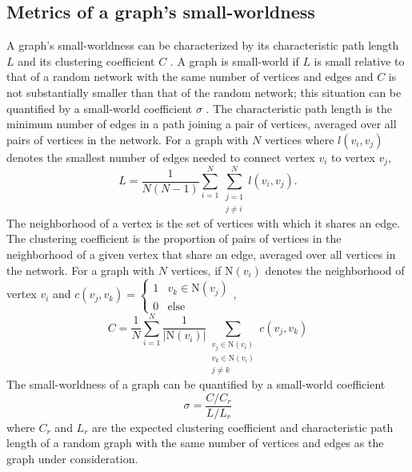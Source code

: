 \documentclass[format=sigconf]{acmart}
\begin{document}
\begin{appendices}


\section{Metrics of a graph's small-worldness}
\label{app:sw_metrics}

A graph's small-worldness can be characterized by its characteristic path length $L$ and its clustering coefficient $C$ \cite{watts98}. A graph is small-world if $L$ is small relative to that of a random network with the same number of vertices and edges and $C$ is not substantially smaller than that of the random network; this situation can be quantified by a small-world coefficient $\sigma$ \cite{humphries2008}. The characteristic path length is the minimum number of edges in a path joining a pair of vertices, averaged over all pairs of vertices in the network. For a graph with $N$ vertices where $l(v_i,v_j)$ denotes the smallest number of edges needed to connect vertex $v_i$ to vertex $v_j$, 
\begin{equation}
\label{eqn:charpathlength}
L=\frac{1}{N(N-1)}\sum_{i=1}^{N}\sum_{\substack{j=1\\j\neq i}}^{N}l(v_i,v_j).
\end{equation}
The neighborhood of a vertex is the set of vertices with which it shares an edge. The clustering coefficient is the proportion of pairs of vertices in the neighborhood of a given vertex that share an edge, averaged over all vertices in the network. For a graph with $N$ vertices, if $\text{N}(v_i)$ denotes the neighborhood of vertex $v_i$ and $c(v_j,v_k)=\begin{cases}1 & v_k\in\text{N}(v_j)\\0 & \text{else}\end{cases}$,
\begin{equation}
\label{eqn:clustcoeff}
C=\frac{1}{N}\sum_{i=1}^{N}\frac{1}{|\text{N}(v_i)|}\sum_{\substack{v_j\in \text{N}(v_i)\\v_k\in\text{N}(v_i)\\j\neq k}}c(v_j,v_k)
\end{equation}
The small-worldness of a graph can be quantified by a small-world coefficient
\begin{equation}
\sigma=\frac{C/C_r}{L/L_r}
\end{equation}
where $C_r$ and $L_r$ are the expected clustering coefficient and characteristic path length of a random graph with the same number of vertices and edges as the graph under consideration.


\end{appendices}
\end{document}
